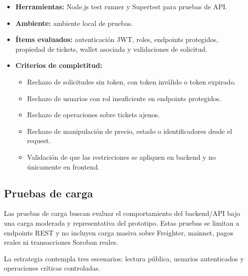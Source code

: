\documentclass[12pt,letterpaper]{article}
\begin{document}
\begin{itemize}
    \item \textbf{Herramientas:} Node.js test runner y Supertest para pruebas de API.
    \item \textbf{Ambiente:} ambiente local de pruebas.
    \item \textbf{Ítems evaluados:} autenticación JWT, roles, endpoints protegidos, propiedad de tickets, wallet asociada y validaciones de solicitud.
    \item \textbf{Criterios de completitud:}
    \begin{itemize}
        \item Rechazo de solicitudes sin token, con token inválido o token expirado.
        \item Rechazo de usuarios con rol insuficiente en endpoints protegidos.
        \item Rechazo de operaciones sobre tickets ajenos.
        \item Rechazo de manipulación de precio, estado o identificadores desde el request.
        \item Validación de que las restricciones se apliquen en backend y no únicamente en frontend.
    \end{itemize}
\end{itemize}

\subsection{Pruebas de carga}

Las pruebas de carga buscan evaluar el comportamiento del backend/API bajo una carga moderada y representativa del prototipo. Estas pruebas se limitan a endpoints REST y no incluyen carga masiva sobre Freighter, mainnet, pagos reales ni transacciones Soroban reales.

La estrategia contempla tres escenarios: lectura pública, usuarios autenticados y operaciones críticas controladas.
\end{document}
